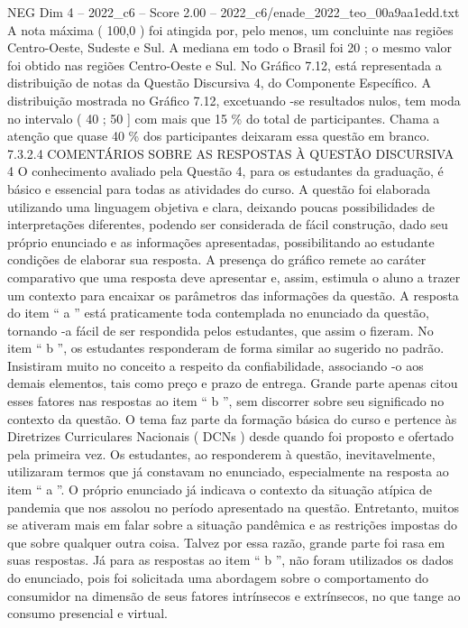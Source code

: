 \begin{textsample}{NEG Dim 4 – 2022\_c6 – Score 2.00 – 2022\_c6/enade\_2022\_teo\_00a9aa1edd.txt}
A nota máxima ( 100,0 ) foi atingida por, pelo menos, um concluinte nas regiões Centro-Oeste, Sudeste e Sul.
A mediana em todo o Brasil foi 20 ; o mesmo valor foi obtido nas regiões Centro-Oeste e Sul.
No Gráfico 7.12, está representada a distribuição de notas da Questão Discursiva 4, do Componente Específico.
A distribuição mostrada no Gráfico 7.12, excetuando -se resultados nulos, tem moda no intervalo ( 40 ; 50 ] com mais que 15 \% do total de participantes.
Chama a atenção que quase 40 \% dos participantes deixaram essa questão em branco. 7.3.2.4 COMENTÁRIOS SOBRE AS RESPOSTAS À QUESTÃO DISCURSIVA 4 O conhecimento avaliado pela Questão 4, para os estudantes da graduação, é básico e essencial para todas as atividades do curso.
A questão foi elaborada utilizando uma linguagem objetiva e clara, deixando poucas possibilidades de interpretações diferentes, podendo ser considerada de fácil construção, dado seu próprio enunciado e as informações apresentadas, possibilitando ao estudante condições de elaborar sua resposta.
A presença do gráfico remete ao caráter comparativo que uma resposta deve apresentar e, assim, estimula o aluno a trazer um contexto para encaixar os parâmetros das informações da questão.
A resposta do item “ a ” está praticamente toda contemplada no enunciado da questão, tornando -a fácil de ser respondida pelos estudantes, que assim o fizeram.
No item “ b ”, os estudantes responderam de forma similar ao sugerido no padrão.
Insistiram muito no conceito a respeito da confiabilidade, associando -o aos demais elementos, tais como preço e prazo de entrega.
Grande parte apenas citou esses fatores nas respostas ao item “ b ”, sem discorrer sobre seu significado no contexto da questão.
O tema faz parte da formação básica do curso e pertence às Diretrizes Curriculares Nacionais ( DCNs ) desde quando foi proposto e ofertado pela primeira vez.
Os estudantes, ao responderem à questão, inevitavelmente, utilizaram termos que já constavam no enunciado, especialmente na resposta ao item “ a ”.
O próprio enunciado já indicava o contexto da situação atípica de pandemia que nos assolou no período apresentado na questão.
Entretanto, muitos se ativeram mais em falar sobre a situação pandêmica e as restrições impostas do que sobre qualquer outra coisa.
Talvez por essa razão, grande parte foi rasa em suas respostas.
Já para as respostas ao item “ b ”, não foram utilizados os dados do enunciado, pois foi solicitada uma abordagem sobre o comportamento do consumidor na dimensão de seus fatores intrínsecos e extrínsecos, no que tange ao consumo presencial e virtual.

\end{textsample}
